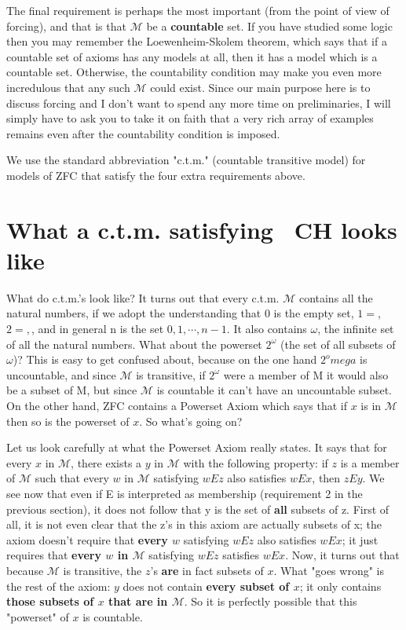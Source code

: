\documentclass[10pt]{article}
\theoremstyle{definition}
\begin{document}
The final requirement is perhaps the most important (from the point of view
of forcing), and that is that $\mathcal{M}$ be a \textbf{countable} set.  If you have studied
some logic then you may remember the Loewenheim-Skolem theorem, which says
that if a countable set of axioms has any models at all, then it has a model
which is a countable set.  Otherwise, the countability condition may make
you even more incredulous that any such $\mathcal{M}$ could exist.  Since our main
purpose here is to discuss forcing and I don't want to spend any more time
on preliminaries, I will simply have to ask you to take it on faith that a
very rich array of examples remains even after the countability condition is
imposed.

We use the standard abbreviation "c.t.m." (countable transitive model) for
models of ZFC that satisfy the four extra requirements above.


\section{What a c.t.m. satisfying ~CH looks like}

What do c.t.m.'s look like?  It turns out that every c.t.m. $\mathcal{M}$ contains
all the natural numbers, if we adopt the understanding that 0 is the empty
set, $1 = {{}}$, $2 = {{}, {{}}}$, and in general n is the set ${0, 1, \cdots, n-1}$.
It also contains $\omega$, the infinite set of all the natural numbers.
What about the powerset $2^\omega$ (the set of all subsets of $\omega$)?
This is easy to get confused about, because on the one hand $2^omega$ is
uncountable, and since $\mathcal{M}$ is transitive, if $2^\omega$ were a member of M
it would also be a subset of M, but since $\mathcal{M}$ is countable it can't have
an uncountable subset.  On the other hand, ZFC contains a Powerset
Axiom which says that if $x$ is in $\mathcal M$ then so is the powerset of $x$.  So
what's going on?

Let us look carefully at what the Powerset Axiom really states.  It says
that for every $x$ in $\mathcal M$, there exists a $y$ in $\mathcal{M}$ with the following property:
if $z$ is a member of $\mathcal{M}$ such that every $w$ in $\mathcal{M}$ satisfying $w E z$ also satisfies
$w E x$, then $z E y$.  We see now that even if E is interpreted as membership
(requirement 2 in the previous section), it does not follow that y is the
set of \textbf{all} subsets of z.  First of all, it is not even clear that the z's
in this axiom are actually subsets of x; the axiom doesn't require that
\textbf{every $w$} satisfying $w E z$ also satisfies $w E x$; it just requires that
\textbf{every $w$ in $\mathcal M$} satisfying $w E z$ satisfies $w E x$.  Now, it turns out that
because $\mathcal{M}$ is transitive, the $z$'s \textbf{are} in fact subsets of $x$.  What "goes
wrong" is the rest of the axiom: $y$ does not contain \textbf{every subset of $x$}; it
only contains \textbf{those subsets of $x$ that are in $\mathcal M$}.  So it is perfectly
possible that this "powerset" of $x$ is countable.
\end{document}
